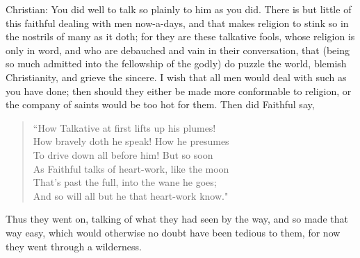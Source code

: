 Christian: You did well to talk so plainly to him as you did. There is but little of this faithful dealing with men now-a-days, and that makes religion to stink so in the nostrils of many as it doth; for they are these talkative fools, whose religion is only in word, and who are debauched and vain in their conversation, that (being so much admitted into the fellowship of the godly) do puzzle the world, blemish Christianity, and grieve the sincere. I wish that all men would deal with such as you have done; then should they either be made more conformable to religion, or the company of saints would be too hot for them. Then did Faithful say,
\begin{verse} 
``How Talkative at first lifts up his plumes!\\
How bravely doth he speak! How he presumes\\
To drive down all before him! But so soon\\
As Faithful talks of heart-work, like the moon\\
That's past the full, into the wane he goes;\\
And so will all but he that heart-work know."\\
\end{verse}
Thus they went on, talking of what they had seen by the way, and so made that way easy, which would otherwise no doubt have been tedious to them, for now they went through a wilderness. 
